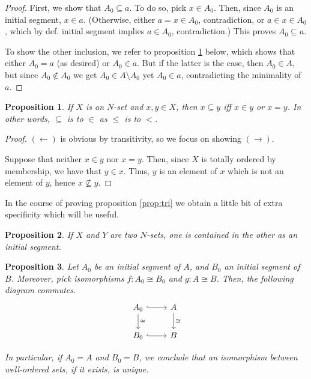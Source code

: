 \documentclass{article}
\newtheorem{prop}{Proposition}
\theoremstyle{nonumberplain}
\newtheorem{proof}{Proof}
\begin{document}
\begin{proof}
First, we show that $A_0 \subseteq a$. To do so, pick $x \in A_0$. Then, since $A_0$ is an initial segment, $x \in a$. (Otherwise, either $a = x \in A_0$, contradiction, or $a \in x \in A_0$, which by def. initial segment implies $a \in A_0$, contradiction.) This proves $A_0 \subseteq a$.

To show the other inclusion, we refer to proposition \ref{prop:leq} below, which shows that either $A_0 = a$ (as desired) or $A_0 \in a$. But if the latter is the case, then $A_0 \in A$, but since $A_0 \notin A_0$ we get $A_0 \in A \setminus A_0$ yet $A_0 \in a$, contradicting the minimality of $a$.
\end{proof}

\begin{prop}\label{prop:leq}
If $X$ is an $N$-set and $x,y \in X$, then $x \subseteq y$ iff $x \in y$ or $x = y$. In other words, $\subseteq$ is to $\in$ as $\leq$ is to $<$.
\end{prop}

\begin{proof}
$(\leftarrow)$ is obvious by transitivity, so we focus on showing $(\rightarrow)$.

Suppose that neither $x \in y$ nor $x = y$. Then, since $X$ is totally ordered by membership, we have that $y \in x$. Thus, $y$ is an element of $x$ which is not an element of $y$, hence $x \nsubseteq y$.
\end{proof}

In the course of proving proposition \ref{prop:tri} we obtain a little bit of extra specificity which will be useful.

\begin{prop}
If $X$ and $Y$ are two $N$-sets, one is contained in the other as an initial segment.
\end{prop}

\begin{prop}\label{prop:nat}
Let $A_0$ be an initial segment of $A$, and $B_0$ an initial segment of $B$. Moreover, pick isomorphisms $f \colon A_0 \cong B_0$ and $g \colon A \cong B$. Then, the following diagram commutes.
\begin{equation}
\begin{tikzcd}
A_0 \arrow[d, "\cong" ] \arrow[r, hook] & A \arrow[d, "\cong" ] \\
B_0 \arrow[r, hook]                                    & B
\end{tikzcd}
\end{equation}

In particular, if $A_0 = A$ and $B_0 = B$, we conclude that an isomorphism between well-ordered sets, if it exists, is unique.
\end{prop}
\end{document}
